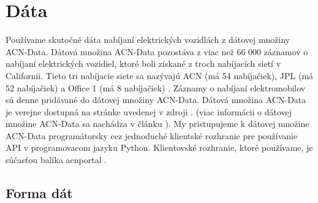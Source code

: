 \chapter{Dáta}
\label{chapter:data}
% 
Používame skutočné dáta nabíjaní elektrických vozidlách z dátovej množiny ACN-Data. Dátová množina ACN-Data pozostáva z viac než 66 000 záznamov o nabíjaní elektrických vozidiel, ktoré boli získané z troch nabíjacích sietí v Californii. Tieto tri nabíjacie siete sa nazývajú ACN (má 54 nabíjačiek), JPL (má 52 nabíjačiek) a Office 1 (má 8 nabíjačiek) \cite{acndata, lee2021acnsim}. Záznamy o nabíjaní elektromobilov sú denne pridávané do dátovej množiny ACN-Data. Dátová množina ACN-Data je verejne dostupná na stránke uvedenej v zdroji \cite{websiteacndata2023}. (viac informácii o dátovej množine ACN-Data sa nachádza v článku \cite{acndata}). My pristupujeme k dátovej množine ACN-Data programátorsky cez jednoduché klientské rozhranie pre používanie API v programovacom jazyku Python. Klientovské rozhranie, ktoré používame, je súčasťou balíka acnportal \cite{acnportalrepository}.









\section{Forma dát}
\label{chapter:data:tvar}



